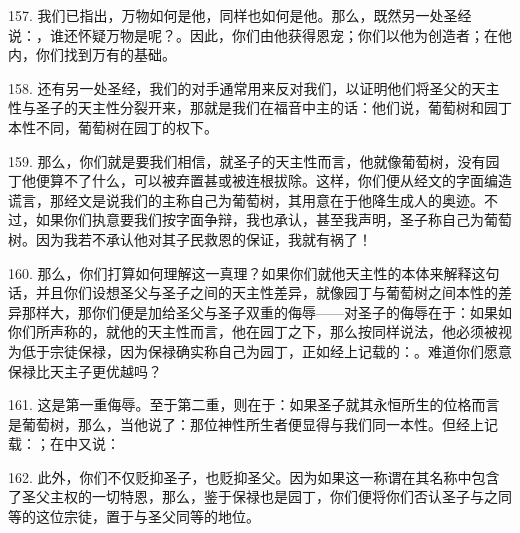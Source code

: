 157. 我们已指出，万物如何是他，同样也如何是他。那么，既然另一处圣经说：，谁还怀疑万物是呢？。因此，你们由他获得恩宠；你们以他为创造者；在他内，你们找到万有的基础。\par

\par

158. 还有另一处圣经，我们的对手通常用来反对我们，以证明他们将圣父的天主性与圣子的天主性分裂开来，那就是我们在福音中主的话：他们说，葡萄树和园丁本性不同，葡萄树在园丁的权下。\par

159. 那么，你们就是要我们相信，就圣子的天主性而言，他就像葡萄树，没有园丁他便算不了什么，可以被弃置甚或被连根拔除。这样，你们便从经文的字面编造谎言，那经文是说我们的主称自己为葡萄树，其用意在于他降生成人的奥迹。不过，如果你们执意要我们按字面争辩，我也承认，甚至我声明，圣子称自己为葡萄树。因为我若不承认他对其子民救恩的保证，我就有祸了！\par

160. 那么，你们打算如何理解这一真理？如果你们就他天主性的本体来解释这句话，并且你们设想圣父与圣子之间的天主性差异，就像园丁与葡萄树之间本性的差异那样大，那你们便是加给圣父与圣子双重的侮辱——对圣子的侮辱在于：如果如你们所声称的，就他的天主性而言，他在园丁之下，那么按同样说法，他必须被视为低于宗徒保禄，因为保禄确实称自己为园丁，正如经上记载的：。难道你们愿意保禄比天主子更优越吗？\par

161. 这是第一重侮辱。至于第二重，则在于：如果圣子就其永恒所生的位格而言是葡萄树，那么，当他说了：那位神性所生者便显得与我们同一本性。但经上记载：；在中又说：\par

162. 此外，你们不仅贬抑圣子，也贬抑圣父。因为如果这一称谓在其名称中包含了圣父主权的一切特恩，那么，鉴于保禄也是园丁，你们便将你们否认圣子与之同等的这位宗徒，置于与圣父同等的地位。\par

